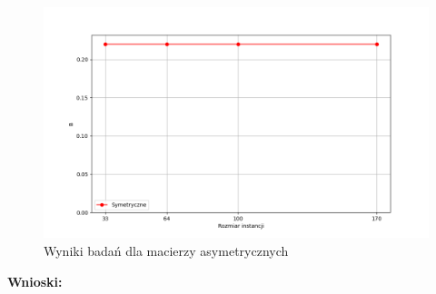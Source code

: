 \documentclass{article}
\begin{document}
        \begin{figure}[ht]
          \centering
          \includegraphics[width=\textwidth]{src/plots/asymtest.png}
          \caption{Wyniki badań dla macierzy asymetrycznych}
          \label{fig:asymNeighg}
        \end{figure}
        \FloatBarrier
        \textbf{Wnioski: }
\end{document}
